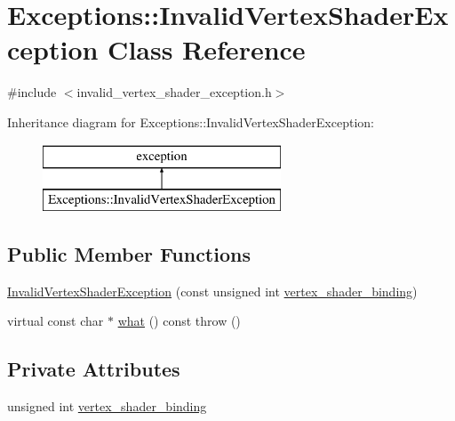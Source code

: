 \hypertarget{class_exceptions_1_1_invalid_vertex_shader_exception}{}\section{Exceptions\+:\+:Invalid\+Vertex\+Shader\+Exception Class Reference}
\label{class_exceptions_1_1_invalid_vertex_shader_exception}


{\ttfamily \#include $<$invalid\+\_\+vertex\+\_\+shader\+\_\+exception.\+h$>$}

Inheritance diagram for Exceptions\+:\+:Invalid\+Vertex\+Shader\+Exception\+:\begin{figure}[H]
\begin{center}
\leavevmode
\includegraphics[height=2.000000cm]{class_exceptions_1_1_invalid_vertex_shader_exception}
\end{center}
\end{figure}
\subsection*{Public Member Functions}
\begin{DoxyCompactItemize}
\item 
\hyperlink{class_exceptions_1_1_invalid_vertex_shader_exception_a9ba81ea3e560d851ada643f0fdd8fefb}{Invalid\+Vertex\+Shader\+Exception} (const unsigned int \hyperlink{class_exceptions_1_1_invalid_vertex_shader_exception_a4bf93e6765dc1611a442cedc749ecb43}{vertex\+\_\+shader\+\_\+binding})
\item 
virtual const char $\ast$ \hyperlink{class_exceptions_1_1_invalid_vertex_shader_exception_a63b07be0e1e29b3f8f4c8f8cfb7eb735}{what} () const   throw ()
\end{DoxyCompactItemize}
\subsection*{Private Attributes}
\begin{DoxyCompactItemize}
\item 
unsigned int \hyperlink{class_exceptions_1_1_invalid_vertex_shader_exception_a4bf93e6765dc1611a442cedc749ecb43}{vertex\+\_\+shader\+\_\+binding}
\end{DoxyCompactItemize}


